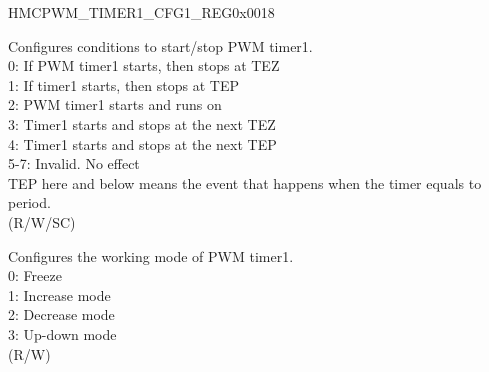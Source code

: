 \begin{register}{H}{MCPWM\_TIMER1\_CFG1\_REG}{0x0018}\label{regdesc:MCPWMTIMER1CFG1REG}
%
%
%
\regnewline%
\begin{regdesc}\begin{reglist}
\label{fielddesc:MCPWMTIMER1START}\item [MCPWM\_TIMER1\_START] Configures conditions to start/stop PWM timer1.
\\0: If PWM timer1 starts, then stops at TEZ
\\1: If timer1 starts, then stops at TEP
\\2: PWM timer1 starts and runs on
\\3: Timer1 starts and stops at the next TEZ
\\4: Timer1 starts and stops at the next TEP
\\5-7: Invalid. No effect
\\TEP here and below means the event that happens when the timer equals to period.
\\(R/W/SC)
\label{fielddesc:MCPWMTIMER1MOD}\item [MCPWM\_TIMER1\_MOD] Configures the working mode of PWM timer1.
\\0: Freeze
\\1: Increase mode
\\2: Decrease mode
\\3: Up-down mode
\\ (R/W)
\end{reglist}\end{regdesc}
\end{register}


